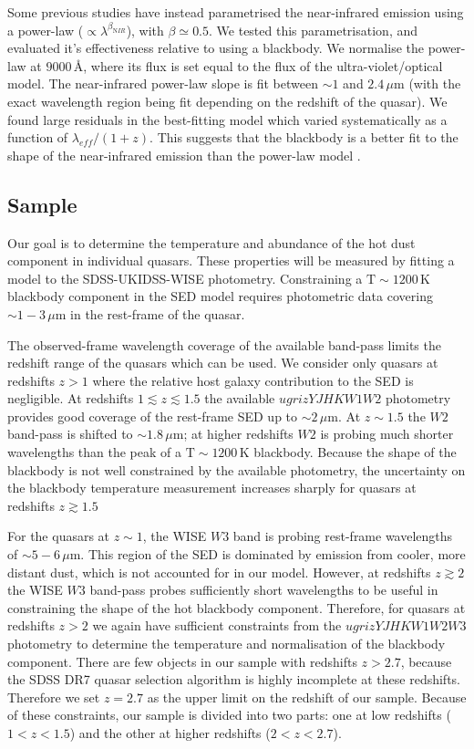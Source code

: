 Some previous studies \citep[e.g.][]{wang13,zhang14} have instead parametrised the near-infrared emission using a power-law ($\propto \lambda^{\beta_{\mathrm NIR}}$), with $\beta \simeq 0.5$. 
We tested this parametrisation, and evaluated it's effectiveness relative to using a blackbody. 
We normalise the power-law at $9000$\,\AA, where its flux is set equal to the flux of the ultra-violet/optical model. 
The near-infrared power-law slope is fit between $\sim1$ and $2.4$\,$\mu$m (with the exact wavelength region being fit depending on the redshift of the quasar). 
We found large residuals in the best-fitting model which varied systematically as a function of $\lambda_{eff}/(1+z)$.  
This suggests that the blackbody is a better fit to the shape of the near-infrared emission than the power-law model \citep[e.g.][]{gallagher07}. 


\subsection{Sample}

Our goal is to determine the temperature and abundance of the hot dust component in individual quasars.  
These properties will be measured by fitting a model to the SDSS-UKIDSS-WISE photometry. 
Constraining a ${\mathrm T}\sim1200$\,K blackbody component in the SED model requires photometric data covering $\sim1-3$\,$\mu$m in the rest-frame of the quasar. 

The observed-frame wavelength coverage of the available band-pass limits the redshift range of the quasars which can be used. 
We consider only quasars at redshifts $z>1$ where the relative host galaxy contribution to the SED is negligible. 
At redshifts $1 \lesssim z \lesssim 1.5$ the available $ugrizYJHKW1W2$ photometry provides good coverage of the rest-frame SED up to $\sim2$\,$\mu$m.
At $z\sim1.5$ the $W2$ band-pass is shifted to $\sim1.8$\,$\mu$m; at higher redshifts $W2$ is probing much shorter wavelengths than the peak of a ${\mathrm T}\sim1200$\,K blackbody. 
Because the shape of the blackbody is not well constrained by the available photometry, the uncertainty on the blackbody temperature measurement increases sharply for quasars at redshifts $z\gtrsim1.5$ 

For the quasars at $z \sim 1$, the WISE $W3$ band is probing rest-frame wavelengths of $\sim5-6$\,$\mu$m. 
This region of the SED is dominated by emission from cooler, more distant dust, which is not accounted for in our model.
However, at redshifts $z \gtrsim 2$ the WISE $W3$ band-pass probes sufficiently short wavelengths to be useful in constraining the shape of the hot blackbody component. 
Therefore, for quasars at redshifts $z > 2$ we again have sufficient constraints from the $ugrizYJHKW1W2W3$ photometry to determine the temperature and normalisation of the blackbody component. 
There are few objects in our sample with redshifts $z > 2.7$, because the SDSS DR7 quasar selection algorithm is highly incomplete at these redshifts.  
Therefore we set $z=2.7$ as the upper limit on the redshift of our sample. 
Because of these constraints, our sample is divided into two parts: one at low redshifts ($1 < z < 1.5$) and the other at higher redshifts ($2 < z < 2.7$). 

